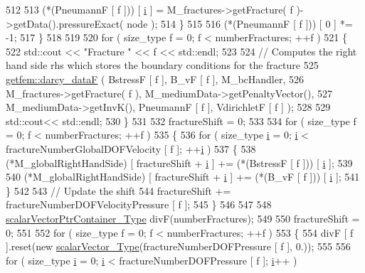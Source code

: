 \begin{DoxyCode}
512 
513             (*(PneumannF [ f ])) [ \hyperlink{matrici_8m_a6f6ccfcf58b31cb6412107d9d5281426}{i} ] = M\_fractures->getFracture( f )->getData().pressureExact( node );
514         \}
515 
516         (*(PneumannF [ f ])) [ 0 ] *= -1; 
517     \}
518 
519     
520     \textcolor{keywordflow}{for} ( size\_type f = 0; f < numberFractures; ++f )
521     \{
522         std::cout << \textcolor{stringliteral}{"Fracture "} << f << std::endl;
523         
524         \textcolor{comment}{// Computes the right hand side rhs which stores the boundary conditions for the fracture}
525         \hyperlink{namespacegetfem_ad6e90b309c01f6b4fc91c9369cba376a}{getfem::darcy\_dataF} ( BstressF [ f ], B\_vF [ f ], M\_bcHandler,
526                               M\_fractures->getFracture( f ), M\_mediumData->getPenaltyVector(),
527                               M\_mediumData->getInvK(), PneumannF [ f ], VdirichletF [ f ] );
528         
529         std::cout<< std::endl;
530     \}
531 
532     fractureShift = 0;
533     
534     \textcolor{keywordflow}{for} ( size\_type f = 0; f < numberFractures; ++f )
535     \{   
536         \textcolor{keywordflow}{for} ( size\_type \hyperlink{matrici_8m_a6f6ccfcf58b31cb6412107d9d5281426}{i} = 0; \hyperlink{matrici_8m_a6f6ccfcf58b31cb6412107d9d5281426}{i} < fractureNumberGlobalDOFVelocity [ f ]; ++\hyperlink{matrici_8m_a6f6ccfcf58b31cb6412107d9d5281426}{i} )
537         \{   
538             (*M\_globalRightHandSide) [ fractureShift + \hyperlink{matrici_8m_a6f6ccfcf58b31cb6412107d9d5281426}{i} ] += (*(BstressF [ f ])) [ 
      \hyperlink{matrici_8m_a6f6ccfcf58b31cb6412107d9d5281426}{i} ];
539 
540             (*M\_globalRightHandSide) [ fractureShift + \hyperlink{matrici_8m_a6f6ccfcf58b31cb6412107d9d5281426}{i} ] += (*(B\_vF [ f ])) [ 
      \hyperlink{matrici_8m_a6f6ccfcf58b31cb6412107d9d5281426}{i} ];
541         \}
542 
543         \textcolor{comment}{// Update the shift}
544         fractureShift += fractureNumberDOFVelocityPressure [ f ];
545     \}
546 
547 
548     \hyperlink{Core_8h_a20f0354ac7b92989514c678f4cdfcb6b}{scalarVectorPtrContainer\_Type} divF(numberFractures);
549 
550     fractureShift = 0;
551     
552     \textcolor{keywordflow}{for} ( size\_type f = 0; f < numberFractures; ++f )
553     \{
554         divF [ f ].reset(\textcolor{keyword}{new} \hyperlink{Core_8h_a4e75b5863535ba1dd79942de2846eff0}{scalarVector\_Type}(fractureNumberDOFPressure [ f ], 0.));
555 
556         \textcolor{keywordflow}{for} ( size\_type \hyperlink{matrici_8m_a6f6ccfcf58b31cb6412107d9d5281426}{i} = 0; \hyperlink{matrici_8m_a6f6ccfcf58b31cb6412107d9d5281426}{i} < fractureNumberDOFPressure [ f ]; \hyperlink{matrici_8m_a6f6ccfcf58b31cb6412107d9d5281426}{i}++ )

\end{DoxyCode}
